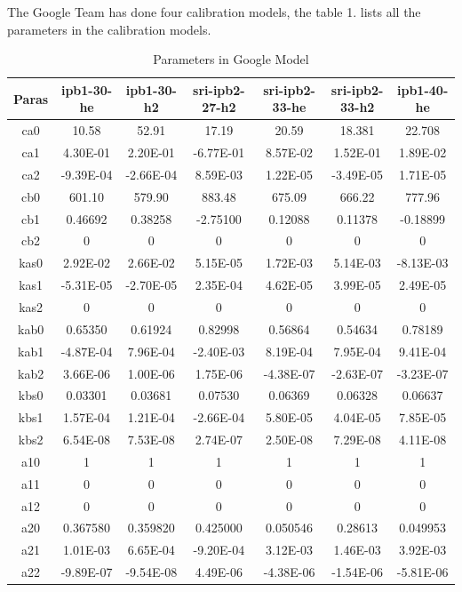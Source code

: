 \documentclass{article}
\begin{document}
The Google Team has done four calibration models, the table 1. lists all the parameters in the calibration models.
\begin{table}[htdp]
\centering
\caption{Parameters in Google Model}

\begin{tabular}{|c|c|c|c|c|c|c|}
\hline
Paras & ipb1-30-he & ipb1-30-h2 & sri-ipb2-27-h2 & sri-ipb2-33-he & sri-ipb2-33-h2 & ipb1-40-he\\ \hline
ca0	&	10.58	&	52.91	&	17.19	&	20.59	&	18.381	&	22.708	\\	\hline
ca1	&	4.30E-01	&	2.20E-01	&	-6.77E-01	&	8.57E-02	&	1.52E-01	&	1.89E-02	\\	\hline
ca2	&	-9.39E-04	&	-2.66E-04	&	8.59E-03	&	1.22E-05	&	-3.49E-05	&	1.71E-05	\\	\hline
cb0	&	601.10	&	579.90	&	883.48	&	675.09	&	666.22	&	777.96	\\	\hline
cb1	&	0.46692	&	0.38258	&	-2.75100	&	0.12088	&	0.11378	&	-0.18899	\\	\hline
cb2	&	0	&	0	&	0	&	0	&	0	&	0	\\	\hline
kas0	&	2.92E-02	&	2.66E-02	&	5.15E-05	&	1.72E-03	&	5.14E-03	&	-8.13E-03	\\	\hline
kas1	&	-5.31E-05	&	-2.70E-05	&	2.35E-04	&	4.62E-05	&	3.99E-05	&	2.49E-05	\\	\hline
kas2	&	0	&	0	&	0	&	0	&	0	&	0	\\	\hline
kab0	&	0.65350	&	0.61924	&	0.82998	&	0.56864	&	0.54634	&	0.78189	\\	\hline
kab1	&	-4.87E-04	&	7.96E-04	&	-2.40E-03	&	8.19E-04	&	7.95E-04	&	9.41E-04	\\	\hline
kab2	&	3.66E-06	&	1.00E-06	&	1.75E-06	&	-4.38E-07	&	-2.63E-07	&	-3.23E-07	\\	\hline
kbs0	&	0.03301	&	0.03681	&	0.07530	&	0.06369	&	0.06328	&	0.06637	\\	\hline
kbs1	&	1.57E-04	&	1.21E-04	&	-2.66E-04	&	5.80E-05	&	4.04E-05	&	7.85E-05	\\	\hline
kbs2	&	6.54E-08	&	7.53E-08	&	2.74E-07	&	2.50E-08	&	7.29E-08	&	4.11E-08	\\	\hline
a10	&	1	&	1	&	1	&	1	&	1	&	1	\\	\hline
a11	&	0	&	0	&	0	&	0	&	0	&	0	\\	\hline
a12	&	0	&	0	&	0	&	0	&	0	&	0	\\	\hline
a20	&	0.367580	&	0.359820	&	0.425000	&	0.050546	&	0.28613	&	0.049953	\\	\hline
a21	&	1.01E-03	&	6.65E-04	&	-9.20E-04	&	3.12E-03	&	1.46E-03	&	3.92E-03	\\	\hline
a22	&	-9.89E-07	&	-9.54E-08	&	4.49E-06	&	-4.38E-06	&	-1.54E-06	&	-5.81E-06	\\	\hline




\end{tabular}
\end{table}
\end{document}
